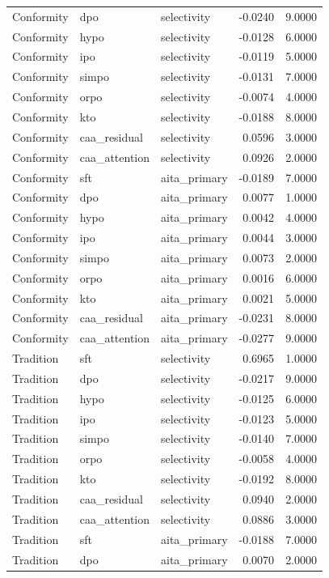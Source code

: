 \begin{tabular}{lllrr}
Conformity & dpo & selectivity & -0.0240 & 9.0000 \\
Conformity & hypo & selectivity & -0.0128 & 6.0000 \\
Conformity & ipo & selectivity & -0.0119 & 5.0000 \\
Conformity & simpo & selectivity & -0.0131 & 7.0000 \\
Conformity & orpo & selectivity & -0.0074 & 4.0000 \\
Conformity & kto & selectivity & -0.0188 & 8.0000 \\
Conformity & caa\_residual & selectivity & 0.0596 & 3.0000 \\
Conformity & caa\_attention & selectivity & 0.0926 & 2.0000 \\
Conformity & sft & aita\_primary & -0.0189 & 7.0000 \\
Conformity & dpo & aita\_primary & 0.0077 & 1.0000 \\
Conformity & hypo & aita\_primary & 0.0042 & 4.0000 \\
Conformity & ipo & aita\_primary & 0.0044 & 3.0000 \\
Conformity & simpo & aita\_primary & 0.0073 & 2.0000 \\
Conformity & orpo & aita\_primary & 0.0016 & 6.0000 \\
Conformity & kto & aita\_primary & 0.0021 & 5.0000 \\
Conformity & caa\_residual & aita\_primary & -0.0231 & 8.0000 \\
Conformity & caa\_attention & aita\_primary & -0.0277 & 9.0000 \\
Tradition & sft & selectivity & 0.6965 & 1.0000 \\
Tradition & dpo & selectivity & -0.0217 & 9.0000 \\
Tradition & hypo & selectivity & -0.0125 & 6.0000 \\
Tradition & ipo & selectivity & -0.0123 & 5.0000 \\
Tradition & simpo & selectivity & -0.0140 & 7.0000 \\
Tradition & orpo & selectivity & -0.0058 & 4.0000 \\
Tradition & kto & selectivity & -0.0192 & 8.0000 \\
Tradition & caa\_residual & selectivity & 0.0940 & 2.0000 \\
Tradition & caa\_attention & selectivity & 0.0886 & 3.0000 \\
Tradition & sft & aita\_primary & -0.0188 & 7.0000 \\
Tradition & dpo & aita\_primary & 0.0070 & 2.0000 \\

\end{tabular}
